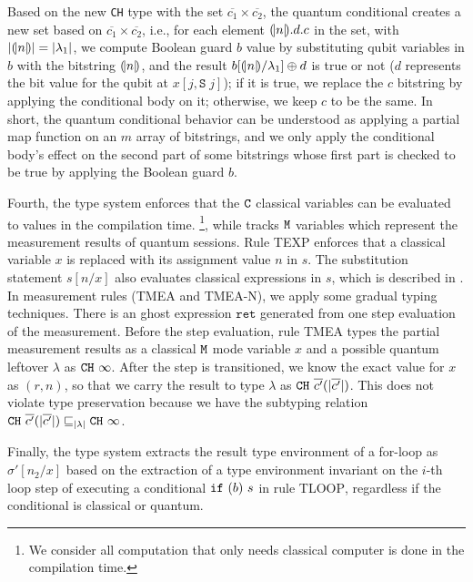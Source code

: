 Based on the new \texttt{CH} type with the set $\overline{c_1}\times \overline{c_2}$,
the quantum conditional creates a new set based on $\overline{c_1}\times \overline{c_2}$, i.e., for each element $(\!| n |\!).d.c$ in the set, with $|(\!| n |\!)|=|\lambda_1|$, we compute Boolean guard $b$ value by substituting qubit variables in $b$ with the bitstring $(\!| n |\!)$, and the result $b[(\!| n |\!) / \lambda_1] \oplus d$ is true or not ($d$ represents the bit value for the qubit at $x[j,\texttt{S}\;j]$); if it is true, we replace the $c$ bitstring by applying the conditional body on it; otherwise, we keep $c$ to be the same.
In short, the quantum conditional behavior can be understood as applying a partial map function on an $m$ array of bitstrings, and we only apply the conditional body's effect on the second part of some bitstrings whose first part is checked to be true by applying the Boolean guard $b$.

Fourth, the type system enforces that the $\texttt{C}$ classical variables can be evaluated to values in the compilation time. \footnote{We consider all computation that only needs classical computer is done in the compilation time.}, while tracks $\texttt{M}$ variables which represent the measurement results of quantum sessions. Rule \textsc{TEXP} enforces that a classical variable $x$ is replaced with its assignment value $n$ in $s$. The substitution statement $s[n/x]$ also evaluates classical expressions in $s$, which is described in .
In measurement rules (\textsc{TMEA} and \textsc{TMEA-N}), we apply some gradual typing techniques.
There is an ghost expression $\texttt{ret}$ generated from one step evaluation of the measurement.
Before the step evaluation, rule \textsc{TMEA} types the partial measurement results as a classical $\texttt{M}$ mode variable $x$ and a possible quantum leftover $\lambda$ as $\texttt{CH}~{\infty}$.
After the step is transitioned, we know the exact value for $x$ as $(r,n)$, so that we carry the result to type $\lambda$ as $\texttt{CH}~{\overline{c'}(|\overline{c'}|)}$. This does not violate type preservation because we have the subtyping relation $\texttt{CH}~{\overline{c'}(|\overline{c'}|)} \sqsubseteq_{|\lambda|} \texttt{CH}~{\infty}$.

Finally, the type system extracts the result type environment of a for-loop as $\sigma'[n_2/x]$ based on the extraction of a type environment invariant on the $i$-th loop step of executing a conditional $\texttt{if}~{(b)}~{s}$ in rule \textsc{TLOOP}, regardless if the conditional is classical or quantum. 



